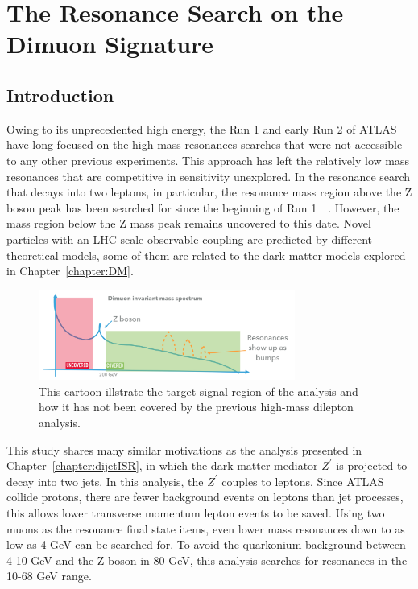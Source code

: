 \chapter{The Resonance Search on the Dimuon Signature}
\label{chapter:dimuon}

\section{Introduction}

Owing to its unprecedented high energy, the Run 1 and early Run 2 of ATLAS have long focused on the high mass resonances searches that were not accessible to any other previous experiments. This approach has left the relatively low mass resonances that are competitive in sensitivity unexplored. In the resonance search that decays into two leptons, in particular, the resonance mass region above the Z boson peak has been searched for since the beginning of Run
1~\cite{Aaboud:2273892}~\cite{Dilepton2019}. However, the mass region below the Z mass peak remains uncovered to this date. Novel particles with an LHC scale observable coupling are predicted by different theoretical models, some of them are related to the dark matter models explored in Chapter~\ref{chapter:DM}.

\begin{figure}[!htb]
    \begin{center}
        \includegraphics[width=0.75\textwidth]{figures/chapter_dimuon/dimuonStudies}        
        \caption{
        This cartoon illstrate the target signal region of the analysis and how it has not been covered by the previous high-mass dilepton analysis. }
            \label{fig:dimuonstudies}
    \end{center}
\end{figure}
\FloatBarrier
   
This study shares many similar motivations as the analysis presented in Chapter~\ref{chapter:dijetISR}, in which the dark matter mediator $Z^\prime$ is projected to decay into two jets. In this analysis, the $Z^\prime$ couples to leptons. Since ATLAS collide protons, there are fewer background events on leptons than jet processes, this allows lower transverse momentum lepton events to be saved. Using two muons as the resonance final state items, even lower mass resonances
down to as low as 4 GeV can be searched for. To avoid the quarkonium background between 4-10 GeV and the Z boson in 80 GeV, this analysis searches for resonances in the 10-68 GeV range.

